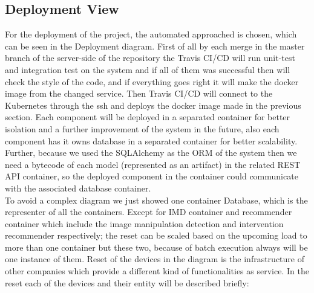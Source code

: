 \subsection{Deployment View}
For the deployment of the project, the automated approached is chosen, which can be seen in the Deployment diagram. First of all by each merge in the master branch of the server-side of the repository the Travis CI/CD will run unit-test and integration test on the system and if all of them was successful then will check the style of the code, and if everything goes right it will make the docker image from the changed service. Then Travis CI/CD will connect to the Kubernetes through the ssh and deploys the docker image made in the previous section. Each component will be deployed in a separated container for better isolation and a further improvement of the system in the future, also each component has it owns database in a separated container for better scalability. Further, because we used the SQLAlchemy as the ORM of the system then we need a bytecode of each model (represented as an artifact) in the related REST API container, so the deployed component in the container could communicate with the associated database container.\\
To avoid a complex diagram we just showed one container Database, which is the representer of all the containers. Except for IMD container and recommender container which include the image manipulation detection and intervention recommender respectively; the reset can be scaled based on the upcoming load to more than one container but these two, because of batch execution always will be one instance of them.  Reset of the devices in the diagram is the infrastructure of other companies which provide a different kind of functionalities as service. In the reset each of the devices and their entity will be described briefly:\\
